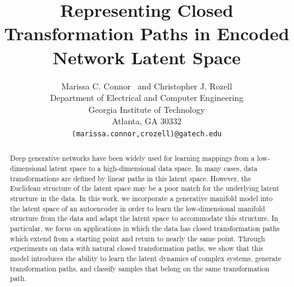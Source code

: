\documentclass[letterpaper]{article} %
\title{Representing Closed Transformation Paths in Encoded Network Latent Space}
\author{
Marissa C. Connor \ and Christopher J. Rozell\\
Department of Electrical and Computer Engineering\\
Georgia Institute of Technology\\
Atlanta, GA 30332 \\
\texttt{(marissa.connor,crozell)@gatech.edu} \\
}
\begin{document}
\maketitle

\begin{abstract}
Deep generative networks have been widely used for learning mappings from a low-dimensional latent space to a high-dimensional data space. In many cases, data transformations are defined by linear paths in this latent space. However, the Euclidean structure of the latent space may be a poor match for the underlying latent structure in the data. In this work, we incorporate a generative manifold model into the latent space of an autoencoder in order to learn the low-dimensional manifold structure from the data and adapt the latent space to accommodate this structure. In particular, we focus on applications in which the data has closed transformation paths which extend from a starting point and return to nearly the same point. Through experiments on data with natural closed transformation paths, we show that this model introduces the ability to learn the latent dynamics of complex systems, generate transformation paths, and classify samples that belong on the same transformation path.
\end{abstract}
\end{document}
